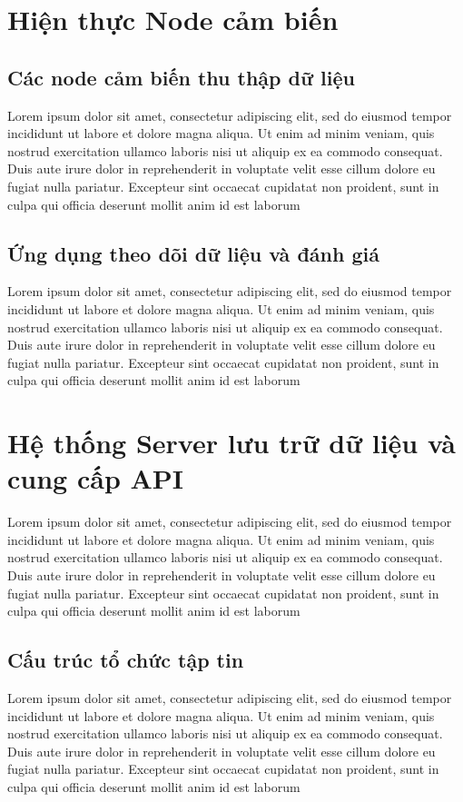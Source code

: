 \section{Hiện thực Node cảm biến}
\subsection{Các node cảm biến thu thập dữ liệu}
Lorem ipsum dolor sit amet, consectetur adipiscing elit, sed do eiusmod tempor incididunt ut labore et dolore magna aliqua. Ut enim ad minim veniam, quis nostrud exercitation ullamco laboris nisi ut aliquip ex ea commodo consequat. Duis aute irure dolor in reprehenderit in voluptate velit esse cillum dolore eu fugiat nulla pariatur. Excepteur sint occaecat cupidatat non proident, sunt in culpa qui officia deserunt mollit anim id est laborum
\subsection{Ứng dụng theo dõi dữ liệu và đánh giá}
Lorem ipsum dolor sit amet, consectetur adipiscing elit, sed do eiusmod tempor incididunt ut labore et dolore magna aliqua. Ut enim ad minim veniam, quis nostrud exercitation ullamco laboris nisi ut aliquip ex ea commodo consequat. Duis aute irure dolor in reprehenderit in voluptate velit esse cillum dolore eu fugiat nulla pariatur. Excepteur sint occaecat cupidatat non proident, sunt in culpa qui officia deserunt mollit anim id est laborum
\section{Hệ thống Server lưu trữ dữ liệu và cung cấp API}
Lorem ipsum dolor sit amet, consectetur adipiscing elit, sed do eiusmod tempor incididunt ut labore et dolore magna aliqua. Ut enim ad minim veniam, quis nostrud exercitation ullamco laboris nisi ut aliquip ex ea commodo consequat. Duis aute irure dolor in reprehenderit in voluptate velit esse cillum dolore eu fugiat nulla pariatur. Excepteur sint occaecat cupidatat non proident, sunt in culpa qui officia deserunt mollit anim id est laborum
\subsection{Cấu trúc tổ chức tập tin}
Lorem ipsum dolor sit amet, consectetur adipiscing elit, sed do eiusmod tempor incididunt ut labore et dolore magna aliqua. Ut enim ad minim veniam, quis nostrud exercitation ullamco laboris nisi ut aliquip ex ea commodo consequat. Duis aute irure dolor in reprehenderit in voluptate velit esse cillum dolore eu fugiat nulla pariatur. Excepteur sint occaecat cupidatat non proident, sunt in culpa qui officia deserunt mollit anim id est laborum
